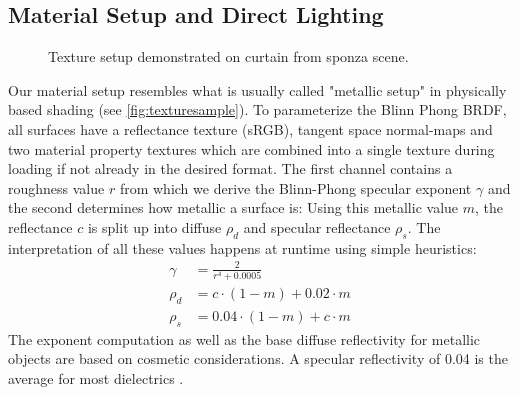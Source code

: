 \documentclass[thesis.tex]{subfiles}
\begin{document}
\subsection{Material Setup and Direct Lighting}
\begin{figure}[h!]
\centering
{}
\caption{Texture setup demonstrated on curtain from sponza scene.}
\label{fig:texturesample}
\end{figure}
Our material setup resembles what is usually called "metallic setup" in physically based shading (see \autoref{fig:texturesample}).
To parameterize the Blinn Phong BRDF, all surfaces have a reflectance texture (sRGB), tangent space normal-maps and two material property textures which are combined into a single texture during loading if not already in the desired format.
The first channel contains a roughness value $r$ from which we derive the Blinn-Phong specular exponent $\gamma$ and the second determines how metallic a surface is:
Using this metallic value $m$, the reflectance $c$ is split up into diffuse $\rho_d$ and specular reflectance $\rho_s$.
The interpretation of all these values happens at runtime using simple heuristics:
\begin{align}
\gamma &= \frac{2}{r^4 + 0.0005}\\
\rho_d &= c \cdot (1-m) + 0.02 \cdot m\\
\rho_s &= 0.04 \cdot (1-m) + c \cdot m
\end{align}
The exponent computation as well as the base diffuse reflectivity for metallic objects are based on cosmetic considerations.
A specular reflectivity of 0.04 is the average for most dielectrics \cite{bib:natypbr}.
\end{document}
